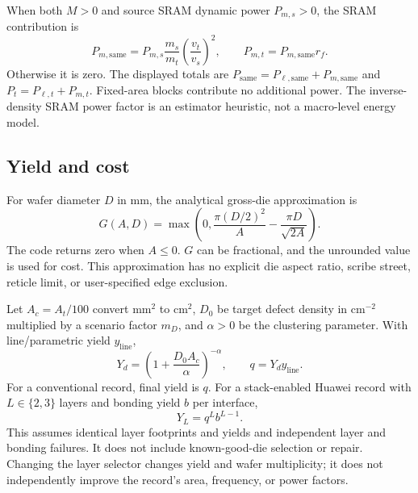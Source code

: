 \documentclass[11pt,a4paper]{article}
\begin{document}
When both $M>0$ and source SRAM dynamic power $P_{m,s}>0$, the SRAM contribution
is
\begin{equation}
P_{m,\mathrm{same}}=P_{m,s}\frac{m_s}{m_t}
\left(\frac{v_t}{v_s}\right)^2,\qquad
P_{m,t}=P_{m,\mathrm{same}}r_f .
\end{equation}
Otherwise it is zero. The displayed totals are
$P_{\mathrm{same}}=P_{\ell,\mathrm{same}}+P_{m,\mathrm{same}}$ and
$P_t=P_{\ell,t}+P_{m,t}$. Fixed-area blocks contribute no additional power.
The inverse-density SRAM power factor is an estimator heuristic, not a
macro-level energy model.

\subsection{Yield and cost}
For wafer diameter $D$ in mm, the analytical gross-die approximation is
\begin{equation}
G(A,D)=\max\left(0,\frac{\pi(D/2)^2}{A}
                   -\frac{\pi D}{\sqrt{2A}}\right). \label{eq:gross}
\end{equation}
The code returns zero when $A\leq0$. $G$ can be fractional, and the unrounded
value is used for cost. This approximation has no explicit die aspect ratio,
scribe street, reticle limit, or user-specified edge exclusion.

Let $A_c=A_t/100$ convert mm$^2$ to cm$^2$, $D_0$ be target defect density
in cm$^{-2}$ multiplied by a scenario factor $m_D$, and $\alpha>0$ be the
clustering parameter. With line/parametric yield $y_{\mathrm{line}}$,
\begin{equation}
Y_d=\left(1+\frac{D_0 A_c}{\alpha}\right)^{-\alpha},\qquad
q=Y_d y_{\mathrm{line}} . \label{eq:yield}
\end{equation}
For a conventional record, final yield is $q$. For a stack-enabled Huawei
record with $L\in\{2,3\}$ layers and bonding yield $b$ per interface,
\begin{equation}
Y_L=q^L b^{L-1}. \label{eq:stack}
\end{equation}
This assumes identical layer footprints and yields and independent layer
and bonding failures. It does not include known-good-die selection or repair.
Changing the layer selector changes yield and wafer multiplicity; it does
not independently improve the record's area, frequency, or power factors.
\end{document}
